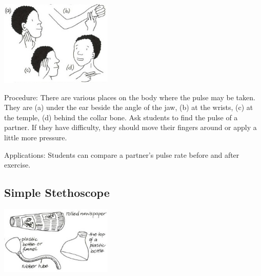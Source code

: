 \begin{multicols}{2}
\begin{center}
\includegraphics[width=0.4\textwidth]{./img/vso/measuring-pulse.jpg}
\end{center}

\begin{description*}
\item[Procedure:]{There are various places on the body where the pulse may be taken.
They are (a) under the ear beside the angle of the jaw, (b) at the wrists,
(c) at the temple, (d) behind the collar bone.
Ask students to find the pulse of a partner. If they have difficulty, they
should move their fingers around or apply a little more pressure.}
\item[Applications:]{Students can compare a partner's pulse rate before and after exercise.}
\end{description*}

\subsection{Simple Stethoscope} %

\begin{center}
\includegraphics[width=0.4\textwidth]{./img/vso/stethoscope.jpg}
\end{center}


\end{multicols}
